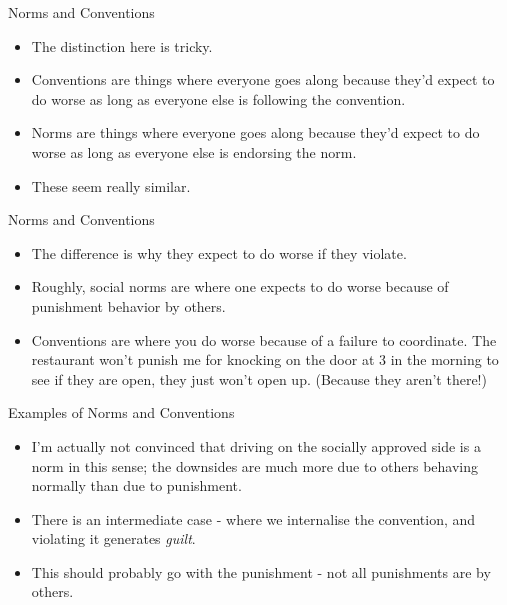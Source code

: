 \documentclass[
  ignorenonframetext,
]{beamer}
\providecommand{\tightlist}{%
  \setlength{\itemsep}{0pt}\setlength{\parskip}{0pt}}
\begin{document}
\begin{frame}{Norms and Conventions}
\protect\hypertarget{norms-and-conventions-1}{}
\begin{itemize}
\tightlist
\item
  The distinction here is tricky.
\item
  Conventions are things where everyone goes along because they'd expect
  to do worse as long as everyone else is following the convention.
\item
  Norms are things where everyone goes along because they'd expect to do
  worse as long as everyone else is endorsing the norm.
\item
  These seem really similar.
\end{itemize}
\end{frame}

\begin{frame}{Norms and Conventions}
\protect\hypertarget{norms-and-conventions-2}{}
\begin{itemize}
\tightlist
\item
  The difference is why they expect to do worse if they violate.
\item
  Roughly, social norms are where one expects to do worse because of
  punishment behavior by others.
\item
  Conventions are where you do worse because of a failure to coordinate.
  The restaurant won't punish me for knocking on the door at 3 in the
  morning to see if they are open, they just won't open up. (Because
  they aren't there!)
\end{itemize}
\end{frame}

\begin{frame}{Examples of Norms and Conventions}
\protect\hypertarget{examples-of-norms-and-conventions}{}
\begin{itemize}
\tightlist
\item
  I'm actually not convinced that driving on the socially approved side
  is a norm in this sense; the downsides are much more due to others
  behaving normally than due to punishment.
\item
  There is an intermediate case - where we internalise the convention,
  and violating it generates \emph{guilt}.
\item
  This should probably go with the punishment - not all punishments are
  by others.
\end{itemize}
\end{frame}
\end{document}
